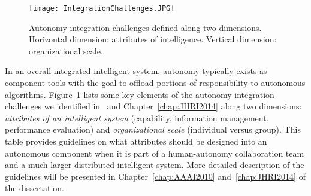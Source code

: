 

\begin{figure}
\centering
\texttt{[image: IntegrationChallenges.JPG]}
\caption[Autonomy integration challenges]{Autonomy integration challenges defined along two dimensions. Horizontal dimension: attributes of intelligence. Vertical dimension: organizational scale.}
\label{challenges}
\end{figure}

In an overall integrated intelligent system, autonomy typically exists as component tools with the goal to offload portions of responsibility to autonomous algorithms. Figure~\ref{challenges} lists some key elements of the autonomy integration challenges we identified in~\cite{Lin2010Supporting} and Chapter~\ref{chap:JHRI2014} along two dimensions: \textit{attributes of an intelligent system} (capability, information management, performance evaluation) and \textit{organizational scale} (individual versus group). This table provides guidelines on what attributes should be designed into an autonomous component when it is part of a human-autonomy collaboration team and a much larger distributed intelligent system. More detailed description of the guidelines will be presented in Chapter~\ref{chap:AAAI2010} and~\ref{chap:JHRI2014} of the dissertation.

